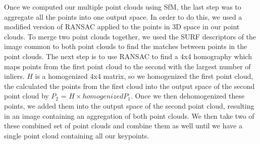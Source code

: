 \documentclass[12pt]{article}
\begin{document}
\begin{multicols}{2}
Once we computed our multiple point clouds using SfM, the last step was to aggregate all the points into one output space. In order to do this, we used a modified version of RANSAC applied to the points in 3D space in our point clouds. To merge two point clouds together, we used the SURF descriptors of the image common to both point clouds to find the matches between points in the point clouds. The next step is to use RANSAC to find a 4x4 homography which maps points from the first point cloud to the second with the largest number of inliers. $H$ is a homogenized 4x4 matrix, so we homogenized the first point cloud, the calculated the points from the first cloud into the output space of the second point cloud by $P_2$ = $H\times homogenizedP_1$. Once we then dehomogenized these points, we added them into the output space of the second point cloud, resulting in an image containing an aggregation of both point clouds. We then take two of these combined set of point clouds and combine them as well until we have a single point cloud containing all our keypoints.



\end{multicols}
\end{document}

